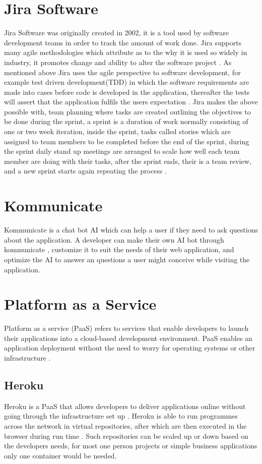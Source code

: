 \section{Jira Software}
Jira Software was originally created in 2002, it is a tool used by software development teams in order to track the amount of work done. Jira supports many agile methodologies which attribute as to the why it is used so widely in industry, it promotes change and ability to alter the software project \cite{fisher2013utilizing}. As mentioned above Jira uses the agile perspective to software development, for example test driven development(TDD) in which the software requirements are made into cases before code is developed in the application, thereafter the tests will assert that the application fulfils the users expectation \cite{havazik2020design}. Jira makes the above possible with, team planning where tasks are created outlining the objectives to be done during the sprint, a sprint is a duration of work normally consisting of one or two week iteration, inside the sprint, tasks called stories which are assigned to team members to be completed before the end of the sprint, during the sprint daily stand up meetings are arranged to scale how well each team member are doing with their tasks, after the sprint ends, their is a team review, and a new sprint starts again repeating the process \cite{marques2018assessing}.

\section{Kommunicate}
Kommunicate is a chat bot AI which can help a user if they need to ask questions about the application. A developer can make their own AI bot through kommunicate \cite{Kommunicate}, customize it to suit the needs of their web application, and optimize the AI to answer an questions a user might conceive while visiting the application.

\section{Platform as a Service}
Platform as a service (PaaS) refers to services that enable developers to launch their applications into a cloud-based development environment. PaaS enables an application deployment without the need to worry for operating systems or other infrastructure \cite{keller2010platform}.

\subsection{Heroku}
Heroku is a PaaS that allows developers to deliver applications online without going through the infrastructure set up \cite{WhyHeroku}. Heroku is able to run programmes across the network in virtual repositories, after which are then executed in the browser during run time \cite{danielsson2021heroku}. Such repositories can be scaled up or down based on the developers needs, for most one person projects or simple business applications only one container would be needed. 

